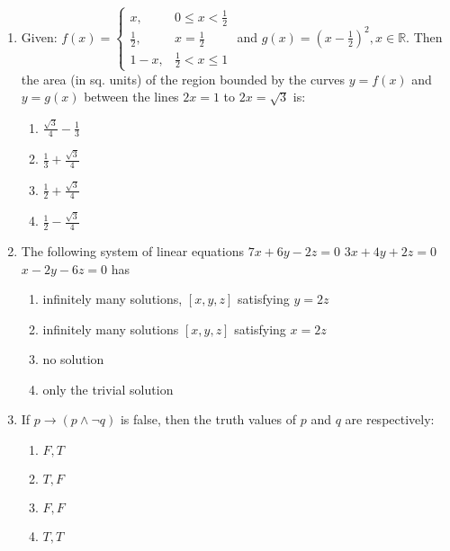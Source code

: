 \documentclass[journal]{IEEEtran}
\newcommand{\brak}[1]{\left( #1 \right)}
\newcommand{\sbrak}[1]{\left[ #1 \right]}
\begin{document}
\begin{enumerate}
    \item Given:
    \( f(x) = 
    \begin{cases}
    x, & 0 \leq x < \frac{1}{2} \\
    \frac{1}{2}, & x = \frac{1}{2} \\
    1 - x, & \frac{1}{2} < x \leq 1
    \end{cases} \)
    and \( g(x) = \brak{ x - \frac{1}{2} }^{2}, x \in \mathbb{R} \).
    Then the area (in sq. units) of the region bounded by the curves \( y = f(x) \) and \( y = g(x) \) between the lines \( 2x = 1 \) to \( 2x = \sqrt{3} \) is:
    \begin{enumerate}
        \item \( \frac{\sqrt{3}}{4} - \frac{1}{3} \)
        \item \( \frac{1}{3} + \frac{\sqrt{3}}{4} \)
        \item \( \frac{1}{2} + \frac{\sqrt{3}}{4} \)
        \item \( \frac{1}{2} - \frac{\sqrt{3}}{4} \)
    \end{enumerate}

    \item The following system of linear equations
    \( 7x + 6y - 2z = 0 \) 
    \( 3x + 4y + 2z = 0 \)
    \( x - 2y - 6z = 0 \)
    has
    \begin{enumerate}
        \item infinitely many solutions, \( \sbrak{ x, y, z } \) satisfying \( y = 2z \)
        \item infinitely many solutions \( \sbrak{ x, y, z } \) satisfying \( x = 2z \)
        \item no solution
        \item only the trivial solution
    \end{enumerate}

    \item If \( p \to \brak{ p \land \neg q } \) is false, then the truth values of \( p \) and \( q \) are respectively:
        \begin{multicols}{4}
        \begin{enumerate}
            \item \( F, T \)  
            \item \( T, F \)  
            \item \( F, F \)  
            \item \( T, T \)
        \end{enumerate}
        \end{multicols}


\end{enumerate}
\end{document}
